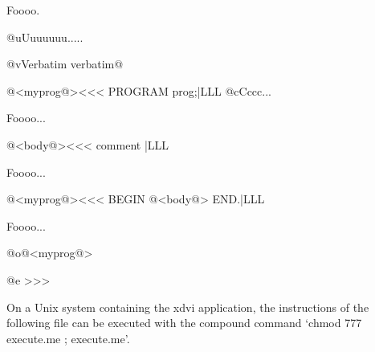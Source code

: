 {Foooo.

@uUuuuuuu.....

@vVerbatim 
verbatim@

@<myprog@><<<
PROGRAM prog;|LLL
@cCccc...

Foooo...

@<body@><<<
{ comment } |LLL

Foooo...

@<myprog@><<<
BEGIN
  @<body@>
END.|LLL

Foooo...

@o@<myprog@>

@e
>>>

\endgroup

\newpage    \OutputCode[me]\execute
 
 
 On a Unix system containing the xdvi application, the instructions of
 the following file can be executed with the compound command 
 `chmod 777 execute.me ; execute.me'.
 
 \bigskip


\bye
